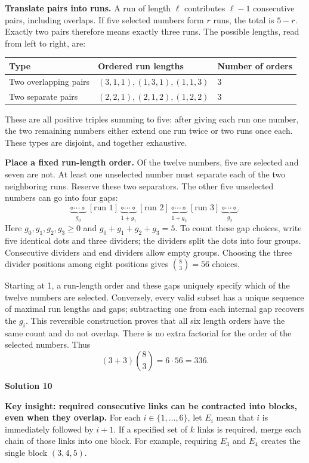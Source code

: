 \documentclass[11pt]{article}
\newcommand{\solution}[1]{%
  \par\Needspace{5\baselineskip}\addvspace{.8\baselineskip}%
  {\large\bfseries Solution #1\par}\nopagebreak[4]}
\begin{document}
\textbf{Translate pairs into runs.} A run of length $\ell$ contributes
$\ell-1$ consecutive pairs, including overlaps. If five selected numbers
form $r$ runs, the total is $5-r$. Exactly two pairs therefore means
exactly three runs. The possible lengths, read from left to right, are:
\begin{center}
\begin{tabular}{@{}lll@{}}
\toprule
Type & Ordered run lengths & Number of orders \\
\midrule
Two overlapping pairs & $(3,1,1),(1,3,1),(1,1,3)$ & $3$ \\
Two separate pairs & $(2,2,1),(2,1,2),(1,2,2)$ & $3$ \\
\bottomrule
\end{tabular}
\end{center}
These are all positive triples summing to five: after giving each run
one number, the two remaining numbers either extend one run twice or
two runs once each. These types are disjoint, and together exhaustive.

\textbf{Place a fixed run-length order.} Of the twelve numbers, five
are selected and seven are not. At least one unselected number must
separate each of the two neighboring runs. Reserve these two separators.
The other five unselected numbers can go into four gaps: \vspace{-3mm}
\[
\underbrace{\circ\cdots\circ}_{g_0}\ [\text{run 1}]\
\underbrace{\circ\cdots\circ}_{1+g_1}\ [\text{run 2}]\
\underbrace{\circ\cdots\circ}_{1+g_2}\ [\text{run 3}]\
\underbrace{\circ\cdots\circ}_{g_3}.
\]
Here $g_0,g_1,g_2,g_3\geq0$ and $g_0+g_1+g_2+g_3=5$.
To count these gap choices, write five identical dots and three dividers;
the dividers split the dots into four groups. Consecutive dividers and
end dividers allow empty groups. Choosing the three divider positions
among eight positions gives $\binom83=56$ choices.

Starting at 1, a run-length order and these gaps uniquely specify which
of the twelve numbers are selected. Conversely, every valid subset has
a unique sequence of maximal run lengths and gaps; subtracting one from
each internal gap recovers the $g_i$. This reversible construction proves
that all six length orders have the same count and do not overlap.
There is no extra factorial for the order of the selected numbers.
Thus
\[
(3+3)\binom83=6\cdot56=\boxed{336}.
\]

\clearpage
\solution{10}
\textbf{Key insight: required consecutive links can be contracted into blocks,
even when they overlap.}
For each $i\in\{1,\ldots,6\}$, let $E_i$ mean that $i$ is immediately
followed by $i+1$. If a specified set of $k$ links is required, merge
each chain of those links into one block. For example, requiring $E_3$
and $E_4$ creates the single block $(3,4,5)$.
\end{document}
